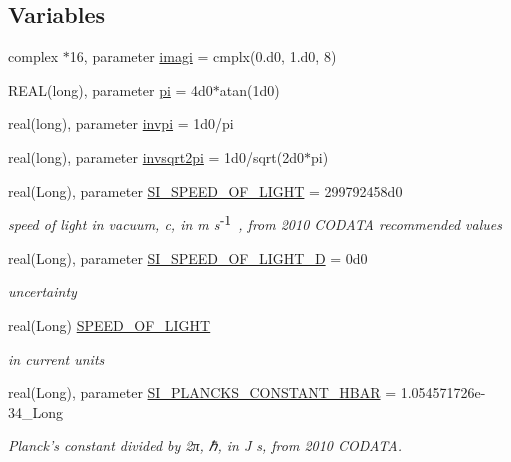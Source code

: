 \subsection*{Variables}
\begin{DoxyCompactItemize}
\item 
complex $\ast$16, parameter \hyperlink{namespacephys__cons_af15f96806bfb6b9c6b1a279971d5d34b}{imagi} = cmplx(0.d0, 1.d0, 8)
\item 
REAL(long), parameter \hyperlink{namespacephys__cons_aae3c6cb8ae765b0262bb110ff739ba9d}{pi} = 4d0$\ast$atan(1d0)
\item 
real(long), parameter \hyperlink{namespacephys__cons_aa8683f00f4216acc1822dfcb85b1ee00}{invpi} = 1d0/pi
\item 
real(long), parameter \hyperlink{namespacephys__cons_a369d33713444a99a71f80a74c0652d4e}{invsqrt2pi} = 1d0/sqrt(2d0$\ast$pi)
\item 
real(Long), parameter \hyperlink{namespacephys__cons_ae265fad966cfc841f9a073a52955d742}{SI\_\-SPEED\_\-OF\_\-LIGHT} = 299792458d0
\begin{DoxyCompactList}\small\item\em speed of light in vacuum, c, in m s$^{\mbox{-\/1}}$ , from 2010 CODATA recommended values \item\end{DoxyCompactList}\item 
real(Long), parameter \hyperlink{namespacephys__cons_a5547546b06eb8853e52e304b25cc7596}{SI\_\-SPEED\_\-OF\_\-LIGHT\_\-D} = 0d0
\begin{DoxyCompactList}\small\item\em uncertainty \item\end{DoxyCompactList}\item 
real(Long) \hyperlink{namespacephys__cons_ac31faa4bb5e82aecbdffa3b3d43a1736}{SPEED\_\-OF\_\-LIGHT}
\begin{DoxyCompactList}\small\item\em in current units \item\end{DoxyCompactList}\item 
real(Long), parameter \hyperlink{namespacephys__cons_ab49e79c21c913c5857dedf2c555d2c21}{SI\_\-PLANCKS\_\-CONSTANT\_\-HBAR} = 1.054571726e-\/34\_\-Long
\begin{DoxyCompactList}\small\item\em Planck's constant divided by 2π, ℏ, in J s, from 2010 CODATA. \item\end{DoxyCompactList}\item 

\end{DoxyCompactItemize}
